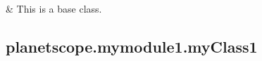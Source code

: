\documentclass[letterpaper,10pt,english]{sphinxmanual}
\begin{document}
\begin{savenotes}\sphinxatlongtablestart\begin{longtable}[c]{}
\hline

\endfirsthead

%
{}\\
\hline

\endhead

\hline
{}\\
\endfoot

\endlastfoot

\sphinxAtStartPar
{\hyperref[\detokenize{_autosummary/planetscope.mymodule1.myClass1:planetscope.mymodule1.myClass1}]{}}
&
\sphinxAtStartPar
This is a base class.
\\
\hline
\end{longtable}\sphinxatlongtableend\end{savenotes}


\subsection{planetscope.mymodule1.myClass1}
\label{\detokenize{_autosummary/planetscope.mymodule1.myClass1:planetscope-mymodule1-myclass1}}\label{\detokenize{_autosummary/planetscope.mymodule1.myClass1::doc}}
\end{document}
